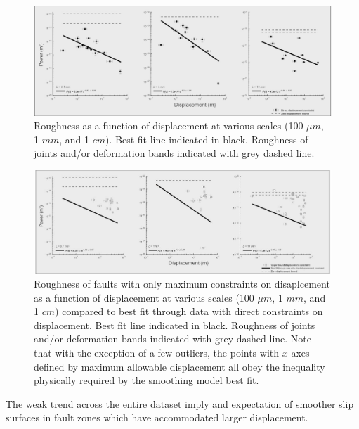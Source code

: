 \documentclass[12pt,a4paper]{article}
\begin{document}
\begin{figure}
	\centering
		\includegraphics[width=1.1 \textwidth]{smoothing_all_scale_no_up}
	\caption{Roughness as a function of displacement at various scales (100 $\mu m$, 1 $mm$, and 1 $cm$). Best fit line indicated in black. Roughness of joints and/or deformation bands indicated with grey dashed line.}
	\label{smoothing1}
\end{figure}


\begin{figure}
	\centering
		\includegraphics[width=1.1 \textwidth]{smoothing_all_scale_just_up}
	\caption{Roughness of faults with only maximum constraints on disaplcement as a function of displacement at various scales (100 $\mu m$, 1 $mm$, and 1 $cm$) compared to best fit through data with direct constraints on displacement. Best fit line indicated in black. Roughness of joints and/or deformation bands indicated with grey dashed line. Note that with the exception of a few outliers, the points with $x$-axes defined by maximum allowable displacement all obey the inequality physically required by the smoothing model best fit.}
	\label{smoothing2}
\end{figure}


The weak trend across the entire dataset imply and expectation of smoother slip surfaces in fault zones which have accommodated larger displacement. 
\end{document}
